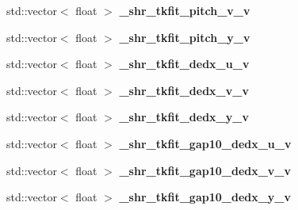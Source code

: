 \begin{DoxyCompactItemize}
\item 
std\+::vector$<$ float $>$ {\bfseries \+\_\+shr\+\_\+tkfit\+\_\+pitch\+\_\+v\+\_\+v}\hypertarget{classanalysis_1_1ShowerAnalysis_ad07e3ce7645736113700026b8984e838}{}\label{classanalysis_1_1ShowerAnalysis_ad07e3ce7645736113700026b8984e838}

\item 
std\+::vector$<$ float $>$ {\bfseries \+\_\+shr\+\_\+tkfit\+\_\+pitch\+\_\+y\+\_\+v}\hypertarget{classanalysis_1_1ShowerAnalysis_aa58d4bc5516a9a92c2c3d3e9d7c9154d}{}\label{classanalysis_1_1ShowerAnalysis_aa58d4bc5516a9a92c2c3d3e9d7c9154d}

\item 
std\+::vector$<$ float $>$ {\bfseries \+\_\+shr\+\_\+tkfit\+\_\+dedx\+\_\+u\+\_\+v}\hypertarget{classanalysis_1_1ShowerAnalysis_a3b797daec291037f040cb9fa1d6b0c03}{}\label{classanalysis_1_1ShowerAnalysis_a3b797daec291037f040cb9fa1d6b0c03}

\item 
std\+::vector$<$ float $>$ {\bfseries \+\_\+shr\+\_\+tkfit\+\_\+dedx\+\_\+v\+\_\+v}\hypertarget{classanalysis_1_1ShowerAnalysis_a942b6174c8ae763fbe0672b90abf05fa}{}\label{classanalysis_1_1ShowerAnalysis_a942b6174c8ae763fbe0672b90abf05fa}

\item 
std\+::vector$<$ float $>$ {\bfseries \+\_\+shr\+\_\+tkfit\+\_\+dedx\+\_\+y\+\_\+v}\hypertarget{classanalysis_1_1ShowerAnalysis_a0486282a97fa9e58d1b6dbf521b686dc}{}\label{classanalysis_1_1ShowerAnalysis_a0486282a97fa9e58d1b6dbf521b686dc}

\item 
std\+::vector$<$ float $>$ {\bfseries \+\_\+shr\+\_\+tkfit\+\_\+gap10\+\_\+dedx\+\_\+u\+\_\+v}\hypertarget{classanalysis_1_1ShowerAnalysis_a2e2b6fd156057d593d6deb187fdf7ce1}{}\label{classanalysis_1_1ShowerAnalysis_a2e2b6fd156057d593d6deb187fdf7ce1}

\item 
std\+::vector$<$ float $>$ {\bfseries \+\_\+shr\+\_\+tkfit\+\_\+gap10\+\_\+dedx\+\_\+v\+\_\+v}\hypertarget{classanalysis_1_1ShowerAnalysis_ae1ea7973a861942c439f22de02823768}{}\label{classanalysis_1_1ShowerAnalysis_ae1ea7973a861942c439f22de02823768}

\item 
std\+::vector$<$ float $>$ {\bfseries \+\_\+shr\+\_\+tkfit\+\_\+gap10\+\_\+dedx\+\_\+y\+\_\+v}\hypertarget{classanalysis_1_1ShowerAnalysis_a46d9fa67893f00eac0c65b5525b09d59}{}\label{classanalysis_1_1ShowerAnalysis_a46d9fa67893f00eac0c65b5525b09d59}


\end{DoxyCompactItemize}
